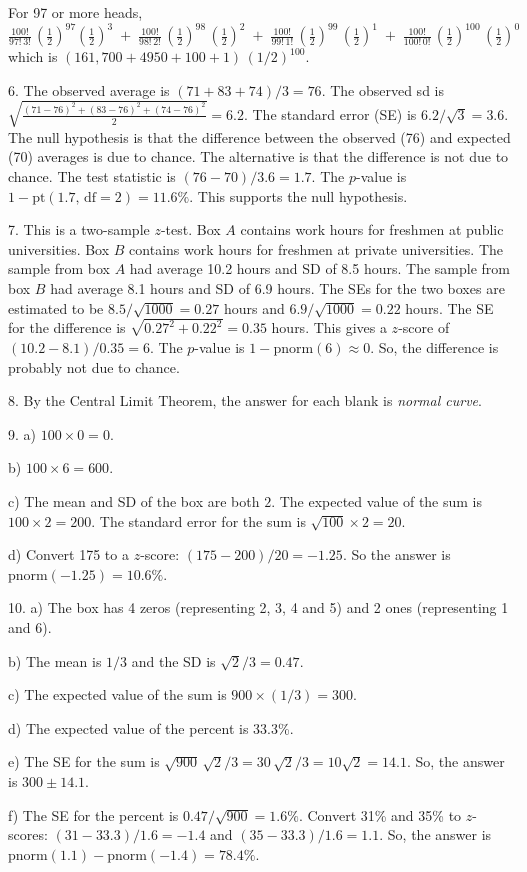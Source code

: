 \documentclass[10pt]{article}
\begin{document}
For 97 or more heads, 
$\displaystyle \frac{100!}{97!\, 3!}\,\left(\frac{1}{2}\right)^{97}\left(\frac{1}{2}\right)^{3}
\; +\;\frac{100!}{98!\, 2!}\,\left(\frac{1}{2}\right)^{98}\,\left(\frac{1}{2}\right)^{2} \;+\;
\frac{100!}{99!\, 1!}\,\left(\frac{1}{2}\right)^{99}\,\left(\frac{1}{2}\right)^{1}\; +\;
\frac{100!}{100!\, 0!}\,\left(\frac{1}{2}\right)^{100}\,\left(\frac{1}{2}\right)^{0}$
which is $(161,\!700 + 4950 + 100 + 1)\,(1/2)^{100}$.
\medskip

6.  The observed average is $(71 + 83 + 74)/3 = 76$.  The observed sd is
$\sqrt{\frac{(71-76)^2 + (83-76)^2 + (74-76)^2}{2}}=6.2$.  The standard error (SE)
is $6.2/\sqrt{3}=3.6$.  
The null hypothesis is that
the difference between the observed (76) and expected (70) averages is due to chance.
The alternative is that the difference is not due to chance.  The test statistic
is $(76-70)/3.6 = 1.7$.  The $p$-value is $1 - \mbox{pt}(1.7, \, \mbox{df}=2)=11.6\%$.
This supports the null hypothesis.
\medskip

7. This is a two-sample $z$-test.  Box $A$ contains work hours for freshmen at public universities.
Box $B$ contains work hours for freshmen at private universities.  The sample from box $A$ had
average 10.2 hours and SD of 8.5 hours. The sample from box $B$ had average 8.1 hours and SD of 6.9
hours.  The SEs for the two boxes are estimated to be $8.5/\sqrt{1000}=0.27$ hours and
$6.9/\sqrt{1000}=0.22$ hours.  The SE for the difference is $\sqrt{0.27^2 + 0.22^2} = 0.35$ hours.
This gives a $z$-score of $(10.2 - 8.1)/0.35 = 6$.  The $p$-value is $1-\mbox{pnorm}(6)\approx 0$.
So, the difference is probably not due to chance.
\vfill
\eject

8. By the Central Limit Theorem, the answer for each blank is \textit{normal curve}.
\medskip

9. a) $100\times 0 = 0$.

b) $100\times 6 = 600$.

c) The mean and SD of the box are both $2$.  The expected value of the sum is 
$100\times 2 = 200$.  The standard error for the sum is $\sqrt{100}\times 2 = 20$.

d) Convert 175 to a  $z$-score:  $(175-200)/20 = -1.25$.  So the answer is 
$\mbox{pnorm}(-1.25)=10.6\%$.
\medskip

10. a) The box has 4 zeros (representing 2, 3, 4 and 5) and 2 ones (representing 1 and 6).

b) The mean is $1/3$ and the SD is $\sqrt{2}/3 = 0.47$.  

c) The expected value of the sum is $900\times (1/3) = 300$.  

d) The expected value of the percent is 33.3\%.

e)  The SE for the sum is $\sqrt{900}\, \sqrt{2}/3 = 30\,\sqrt{2}/3 = 10\sqrt{2}=14.1$.
So, the answer is $300\pm 14.1$.

f) The SE for the percent is $0.47/\sqrt{900} = 1.6\%$.
Convert 31\% and 35\% to $z$-scores:  
$(31-33.3)/1.6=-1.4$ and $(35-33.3)/1.6=1.1$.  So, the answer is
$\mbox{pnorm}(1.1) - \mbox{pnorm}(-1.4)=78.4\%$.
\vfill
\eject
\end{document}
